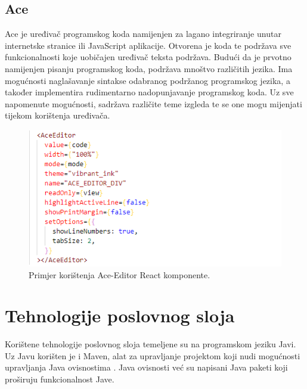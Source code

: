 \documentclass[times, utf8, zavrsni]{fer}
\begin{document}
			\subsection{Ace}
			Ace je uređivač programskog koda namijenjen za lagano integriranje unutar internetske stranice ili JavaScript aplikacije. Otvorena je koda te podržava sve funkcionalnosti koje uobičajen uređivač teksta podržava. Budući da je prvotno namijenjen pisanju programskog koda, podržava mnoštvo različitih jezika. Ima mogućnosti naglašavanje sintakse odabranog podržanog programskog jezika, a također implementira rudimentarno nadopunjavanje programskog koda. Uz sve napomenute mogućnosti, sadržava različite teme izgleda te se one mogu mijenjati tijekom korištenja uređivača.
			\begin{figure}[H]
				\centering
				\includegraphics[scale=0.75]{pictures/prikazi/AceEditor.png}
				\caption{Primjer korištenja Ace-Editor React komponente.}
				\label{fig:ace}
			\end{figure}
	
		\section{Tehnologije poslovnog sloja}
		Korištene tehnologije poslovnog sloja temeljene su na programskom jeziku Javi. Uz Javu korišten je i Maven, alat za upravljanje projektom koji nudi mogućnosti upravljanja Java ovisnostima . Java ovisnosti već su napisani Java paketi koji proširuju funkcionalnost Jave.
\end{document}
